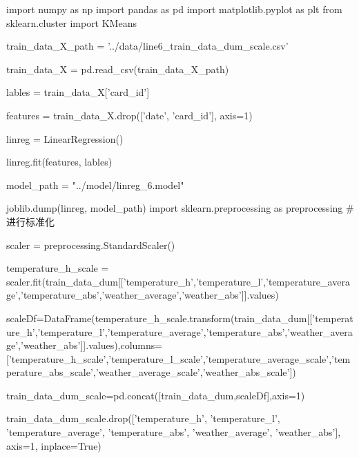 \documentclass[UTF8]{ctexart}
\begin{document}
	\begin{python}
		import numpy as np
		import pandas as pd
		import matplotlib.pyplot as plt
		from sklearn.cluster import KMeans
		
		train_data_X_path = '../data/line6_train_data_dum_scale.csv'
		
		train_data_X = pd.read_csv(train_data_X_path)
		
		lables = train_data_X['card_id']
		
		features = train_data_X.drop(['date', 'card_id'], axis=1)
		
		linreg = LinearRegression()
		
		linreg.fit(features, lables)
		
		model_path = "../model/linreg_6.model"
		
		joblib.dump(linreg, model_path)
		import sklearn.preprocessing as preprocessing
		#进行标准化
		
		scaler = preprocessing.StandardScaler()
		
		temperature_h_scale = scaler.fit(train_data_dum[['temperature_h','temperature_l','temperature_average','temperature_abs','weather_average','weather_abs']].values)
		
		scaleDf=DataFrame(temperature_h_scale.transform(train_data_dum[['temperature_h','temperature_l','temperature_average','temperature_abs','weather_average','weather_abs']].values),columns=['temperature_h_scale','temperature_l_scale','temperature_average_scale','temperature_abs_scale','weather_average_scale','weather_abs_scale'])
		
		train_data_dum_scale=pd.concat([train_data_dum,scaleDf],axis=1)
		
		train_data_dum_scale.drop(['temperature_h', 'temperature_l', 'temperature_average', 'temperature_abs', 'weather_average', 'weather_abs'], axis=1, inplace=True)
		
		
	\end{python}
	
\end{document}
